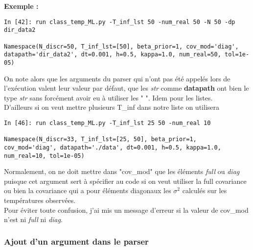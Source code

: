 \documentclass[a4paper,12pt]{article}
\newcommand\bk{\color{black}}
\newcommand{\dgreen}{\color{dgreen}}
\numberwithin{equation}{section} %
\begin{document}
\dgreen \textbf {Exemple :} \bk \\
\begin{lstlisting}
In [42]: run class_temp_ML.py -T_inf_lst 50 -num_real 50 -N 50 -dp dir_data2

Namespace(N_discr=50, T_inf_lst=[50], beta_prior=1, cov_mod='diag', datapath='dir_data2', dt=0.001, h=0.5, kappa=1.0, num_real=50, tol=1e-05)

\end{lstlisting}
On note alors que les arguments du parser qui n'ont pas été appelés lors de l'exécution valent leur valeur par défaut, que les \textit{str} comme \textbf{datapath} ont bien le type \textit{str} sans forcément avoir eu à utiliser les " ". Idem pour les listes. \\

\noindent D'ailleurs si on veut mettre plusieurs T\_inf dans notre liste on utilisera 

\begin{lstlisting}
In [46]: run class_temp_ML.py -T_inf_lst 25 50 -num_real 10

Namespace(N_discr=33, T_inf_lst=[25, 50], beta_prior=1, cov_mod='diag', datapath='./data', dt=0.001, h=0.5, kappa=1.0, num_real=10, tol=1e-05)
\end{lstlisting}

\noindent Normalement, on ne doit mettre dans "cov\_mod" que les éléments \textit{full} ou \textit{diag} puisque cet argument sert à spécifier au code si on veut utiliser la full covariance ou bien la covariance qui a 
pour éléments diagonaux les $\sigma^2$ calculés sur les températures observées. \\
Pour éviter toute confusion, j'ai mis un message d'erreur si la valeur de cov\_mod n'est ni \textit{full} ni \textit{diag}.

\subsubsection*{Ajout d'un argument dans le parser}
\end{document}
